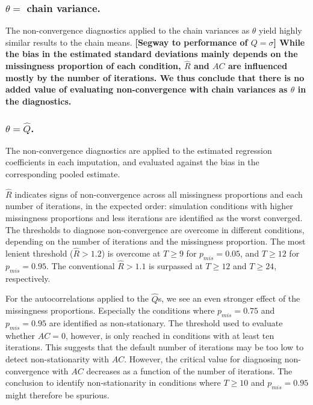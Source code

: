 \documentclass[Royal,times,sageh]{sagej}
\begin{document}
\hypertarget{theta-chain-variance.}{%
\subsubsection{\texorpdfstring{\(\theta=\) chain variance.}{\textbackslash theta= chain variance.}}\label{theta-chain-variance.}}

The non-convergence diagnostics applied to the chain variances as \(\theta\) yield highly similar results to the chain means. \textbf{{[}Segway to performance of \(Q=\sigma\){]} While the bias in the estimated standard deviations mainly depends on the missingness proportion of each condition, \(\widehat{R}\) and \(AC\) are influenced mostly by the number of iterations. We thus conclude that there is no added value of evaluating non-convergence with chain variances as \(\theta\) in the diagnostics.}

\hypertarget{thetahatq.}{%
\subsubsection{\texorpdfstring{\(\theta=\hat{Q}\).}{\textbackslash theta=\textbackslash hat\{Q\}.}}\label{thetahatq.}}

The non-convergence diagnostics are applied to the estimated regression coefficients in each imputation, and evaluated against the bias in the corresponding pooled estimate.

\(\widehat{R}\) indicates signs of non-convergence across all missingness proportions and each number of iterations, in the expected order: simulation conditions with higher missingness proportions and less iterations are identified as the worst converged. The thresholds to diagnose non-convergence are overcome in different conditions, depending on the number of iterations and the missingness proportion. The most lenient threshold (\(\widehat{R}>1.2\)) is overcome at \(T\geq9\) for \(p_{mis} = 0.05\), and \(T\geq12\) for \(p_{mis} = 0.95\). The conventional \(\widehat{R}>1.1\) is surpassed at \(T\geq12\) and \(T\geq24\), respectively.

For the autocorrelations applied to the \(\hat{Q}\)s, we see an even stronger effect of the missingness proportions. Especially the conditions where \(p_{mis} = 0.75\) and \(p_{mis} = 0.95\) are identified as non-stationary. The threshold used to evaluate whether \(AC=0\), however, is only reached in conditions with at least ten iterations. This suggests that the default number of iterations may be too low to detect non-stationarity with \(AC\). However, the critical value for diagnosing non-convergence with \(AC\) decreases as a function of the number of iterations. The conclusion to identify non-stationarity in conditions where \(T\geq10\) and \(p_{mis} = 0.95\) might therefore be spurious.
\end{document}

